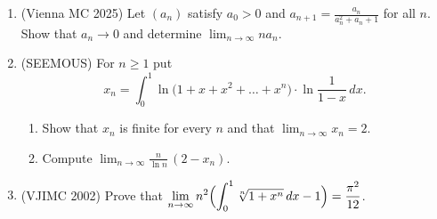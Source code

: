 \documentclass[11pt,a4paper]{article}
\renewcommand{\ge}{\geqslant}
\begin{document}
\begin{enumerate}
\item (Vienna MC 2025) Let $(a_n)$ satisfy $a_0>0$ and $a_{n+1}=\frac{a_n}{a_n^2+a_n+1}$ for all
$n$. Show that $a_n\to0$ and determine $\lim_{n\to\infty}na_n$.

\item (SEEMOUS) For $n\ge1$ put
\[
x_n=\int_0^1\ln\bigl(1+x+x^2+\dots+x^n\bigr)\cdot\ln\frac1{1-x}\,dx.
\]
\begin{enumerate}[label=\alph*)]
\item Show that $x_n$ is finite for every $n$ and that $\lim_{n\to\infty}x_n=2$.
\item Compute $\lim_{n\to\infty}\frac n{\ln n}\,(2-x_n)$.
\end{enumerate}

\item (VJIMC 2002) Prove that
$\displaystyle\lim_{n\to\infty}n^2\Bigl(\int_0^1\sqrt[n]{1+x^n}\,dx-1\Bigr)=\frac{\pi^2}{12}$.
\end{enumerate}
\end{document}
